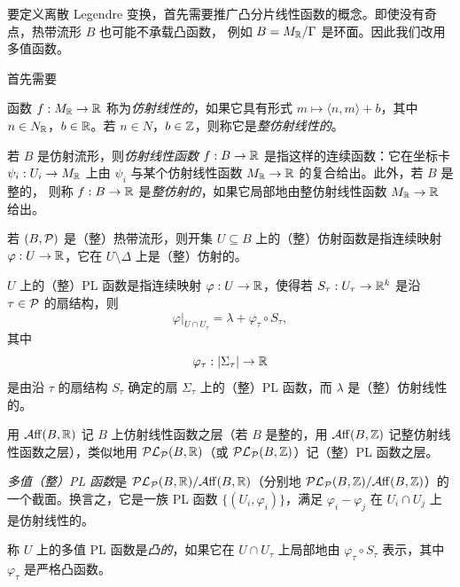 要定义离散 Legendre 变换，首先需要推广凸分片线性函数的概念。即使没有奇点，热带流形 $B$ 也可能不承载凸函数，
例如 $B = M_{\mathbb{R}}/\Gamma$ 是环面。因此我们改用多值函数。

首先需要

\begin{definition}
函数 $f : M_{\mathbb{R}} \to \mathbb{R}$ 称为\emph{仿射线性的}，如果它具有形式 $m \mapsto \langle n, m\rangle + b$，其中
$n\in N_{\mathbb{R}}$，$b\in\mathbb{R}$。若 $n\in N$，$b\in\mathbb{Z}$，则称它是\emph{整仿射线性的}。
\end{definition}

\begin{definition}
若 $B$ 是仿射流形，则\emph{仿射线性函数} $f : B \to \mathbb{R}$ 是指这样的连续函数：它在坐标卡
$\psi_i : U_i \to M_{\mathbb{R}}$ 上由 $\psi_i$ 与某个仿射线性函数 $M_{\mathbb{R}} \to \mathbb{R}$ 的复合给出。此外，若 $B$ 是整的，
则称 $f : B\to\mathbb{R}$ 是\emph{整仿射的}，如果它局部地由整仿射线性函数 $M_{\mathbb{R}} \to \mathbb{R}$ 给出。

若 $(B,\mathcal{P})$ 是（整）热带流形，则开集 $U \subseteq B$ 上的（整）仿射函数是指连续映射
$\varphi : U \to \mathbb{R}$，它在 $U\setminus\Delta$ 上是（整）仿射的。

$U$ 上的（整）PL 函数是指连续映射 $\varphi : U \to \mathbb{R}$，使得若 $S_\tau : U_\tau \to \mathbb{R}^k$ 是沿
$\tau\in\mathcal{P}$ 的扇结构，则
\begin{equation}
\varphi|_{U\cap U_\tau} = \lambda + \varphi_\tau \circ S_\tau, \tag{1.4}
\end{equation}
其中
\[
\varphi_\tau : |\Sigma_\tau| \to \mathbb{R}
\]
是由沿 $\tau$ 的扇结构 $S_\tau$ 确定的扇 $\Sigma_\tau$ 上的（整）PL 函数，而 $\lambda$ 是（整）仿射线性的。

用 $\mathcal{A}\mathrm{ff}(B,\mathbb{R})$ 记 $B$ 上仿射线性函数之层（若 $B$ 是整的，用
$\mathcal{A}\mathrm{ff}(B,\mathbb{Z})$ 记整仿射线性函数之层），类似地用 $\mathcal{PL}_{\mathcal{P}}(B,\mathbb{R})$（或
$\mathcal{PL}_{\mathcal{P}}(B,\mathbb{Z})$）记（整）PL 函数之层。

\emph{多值（整）PL 函数}是 $\mathcal{PL}_{\mathcal{P}}(B,\mathbb{R})/\mathcal{A}\mathrm{ff}(B,\mathbb{R})$（分别地
$\mathcal{PL}_{\mathcal{P}}(B,\mathbb{Z})/\mathcal{A}\mathrm{ff}(B,\mathbb{Z})$）的一个截面。换言之，它是一族 PL 函数
$\{(U_i,\varphi_i)\}$，满足 $\varphi_i - \varphi_j$ 在 $U_i\cap U_j$ 上是仿射线性的。

称 $U$ 上的多值 PL 函数是\emph{凸的}，如果它在 $U\cap U_\tau$ 上局部地由
$\varphi_\tau\circ S_\tau$ 表示，其中 $\varphi_\tau$ 是严格凸函数。
\end{definition}



